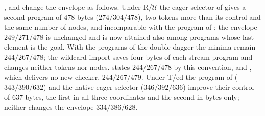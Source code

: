 ,  and
 change the envelope as follows. Under
R/$\mathcal U$ the eager selector of  gives a second
program of $478$ bytes ($274/304/478$), two tokens more than its control and
the same number of nodes, and incomparable with the program of
; the envelope $249/271/478$ is unchanged and is now
attained also among programs whose last element is the goal. With the
programs of the double dagger the minima remain $244/267/478$; the wildcard
import saves four bytes of each stream program and changes neither tokens nor
nodes.  states $244/267/478$ by this convention, and
, which delivers no new checker, $244/267/479$.
Under T/ed the program of  ($343/390/632$) and the
native eager selector ($346/392/636$) improve their control of $637$ bytes,
the first in all three coordinates and the second in bytes only; neither
changes the envelope $334/386/628$.

